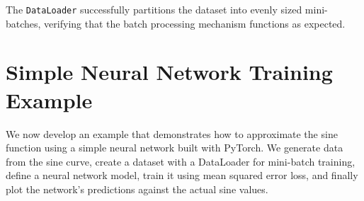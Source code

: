 The \texttt{DataLoader} successfully partitions the dataset into evenly sized mini-batches, verifying that the batch processing mechanism functions as expected.

%
\section{Simple Neural Network Training Example}

We now develop an example that demonstrates how to approximate the sine function using a simple neural network built with PyTorch. We generate data from the sine curve, create a dataset with a DataLoader for mini-batch training, define a neural network model, train it using mean squared error loss, and finally plot the network's predictions against the actual sine values.

